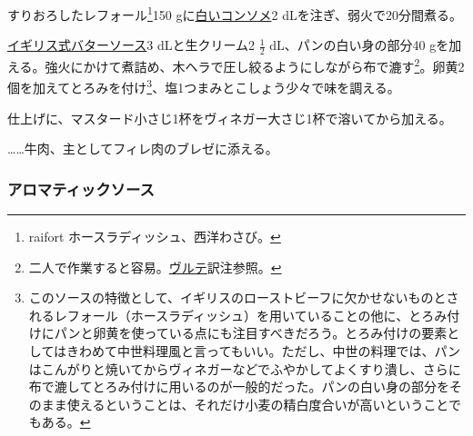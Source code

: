 \begin{recette}


すりおろしたレフォール\footnote{raifort ホースラディッシュ、西洋わさび。}150
gに\protect\hyperlink{}{白いコンソメ}2 dLを注ぎ、弱火で20分間煮る。

\protect\hyperlink{butter-sauce}{イギリス式バターソース}3
dLと生クリーム2 \(\frac{1}{2}\) dL、パンの白い身の部分40
gを加える。強火にかけて煮詰め、木ヘラで圧し絞るようにしながら布で漉す\footnote{二人で作業すると容易。\protect\hyperlink{veloute}{ヴルテ}訳注参照。}。卵黄2個を加えてとろみを付け\footnote{このソースの特徴として、イギリスのローストビーフに欠かせないものとされるレフォール（ホースラディッシュ）を用いていることの他に、とろみ付けにパンと卵黄を使っている点にも注目すべきだろう。とろみ付けの要素としてはきわめて中世料理風と言ってもいい。ただし、中世の料理では、パンはこんがりと焼いてからヴィネガーなどでふやかしてよくすり潰し、さらに布で漉してとろみ付けに用いるのが一般的だった。パンの白い身の部分をそのまま使えるということは、それだけ小麦の精白度合いが高いということでもある。}、塩1つまみとこしょう少々で味を調える。

仕上げに、マスタード小さじ1杯をヴィネガー大さじ1杯で溶いてから加える。

\ldots{}\ldots{}牛肉、主としてフィレ肉のブレゼに添える。

\hypertarget{aromatic-sauce}{%
\subsubsection{アロマティックソース}\label{aromatic-sauce}}





\end{recette}
